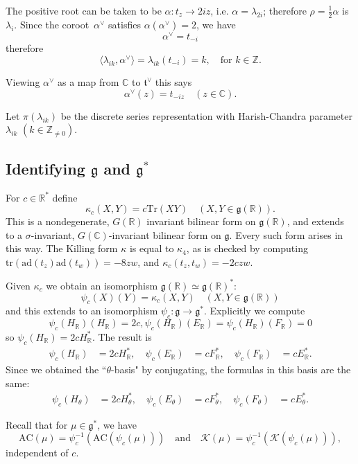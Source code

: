 \documentclass[cupthm]{CUP-JNL-JMJ}
\numberwithin{equation}{section}
\theoremstyle{cupplain}
\theoremstyle{cupdefinition}
\theoremstyle{cupremark}
\theoremstyle{cupproof}
\newcommand{\ad}{\mathrm{ad}}
\newcommand{\R}{\mathbb R}
\newcommand{\C}{\mathbb C}
\newcommand{\Z}{\mathbb Z}
\newcommand{\K}{\mathcal K}
\newcommand{\ch}[1]{#1^\vee}
\newcommand{\g}{\mathfrak g}
\newcommand{\AC}{\mathrm{AC}}
\begin{document}
The positive root can be taken to be   $\alpha\colon t_z \to 2iz$, i.e.
$\alpha=\lambda_{2i}$; therefore $\rho=\frac12\alpha$ is~$\lambda_i$.
Since the coroot~$\ch\alpha$ satisfies $\alpha(\ch\alpha)=2$, we have
$$
\ch\alpha=t_{-i}
$$
therefore
$$
\langle \lambda_{ik},\ch\alpha\rangle=\lambda_{ik}(t_{-i})=k,\quad \text{for } k \in \Z.
$$

Viewing $\ch\alpha$ as a map from $\C$ to $\ch{\mathfrak t}$ this says
$$
\ch\alpha(z)=t_{-iz}\quad (z\in \C).
$$

Let $\pi(\lambda_{ik})$ be the discrete series representation with Harish-Chandra parameter $\lambda_{ik}$ $(k\in \Z_{\ne 0})$.

\subsection{Identifying  $\g$ and $\g^*$}


For $c\in \R^*$ define
$$
\kappa_c(X,Y)=c\mathrm{Tr}(XY)\quad (X,Y\in \g(\R)).
$$
This is a nondegenerate, $G(\R)$ invariant bilinear form on $\g(\R)$, and extends to a $\sigma$-invariant, $G(\C)$-invariant bilinear form on $\g$. 
Every such form arises in this way.
The Killing form $\kappa$ is equal to $\kappa_4$, 
as is checked by computing  $\mathrm{tr}(\ad(t_z)\ad(t_w))=-8zw$, and 
 $\kappa_c(t_z,t_w)=-2czw$.

Given $\kappa_c$ we obtain an isomorphism $\g(\R)\simeq \g(\R)^*$:
$$
\psi_c(X)(Y)=\kappa_c(X,Y)\quad (X,Y\in \g(\R))
$$
and this extends to an isomorphism $\psi_c: \g\rightarrow \g^*$. 
Explicitly we compute
$$
\psi_c(H_\R)(H_\R)=2c, \psi_c(H_\R)(E_\R)= \psi_c(H_\R)(F_\R)=0
$$
so  $\psi_c(H_\R)=2cH_\R^*$.
The result is
\begin{equation}
\label{e:psic1}
\begin{aligned}
\psi_c(H_\R)&=2cH_\R^*, \quad
\psi_c(E_\R)&=cF_\R^*, \quad
\psi_c(F_\R)&=cE_\R^*.
\end{aligned}
\end{equation}
Since we obtained the ``$\theta$-basis" by conjugating, the formulas in this basis are the same:
\begin{equation}
\label{e:psic2}
\begin{aligned}
\psi_c(H_\theta)&=2cH_\theta^*, \quad
\psi_c(E_\theta)&=cF_\theta^*, \quad
\psi_c(F_\theta)&=cE_\theta^*.
\end{aligned}
\end{equation}

Recall that for $\mu\in \g^*$, we have
$$
\AC(\mu)=\psi_c^{-1}(\AC(\psi_c(\mu)))
\quad \text{and} \quad 
\K(\mu)=\psi_c^{-1}(\K(\psi_c(\mu))),
$$
independent of $c$.
\end{document}
